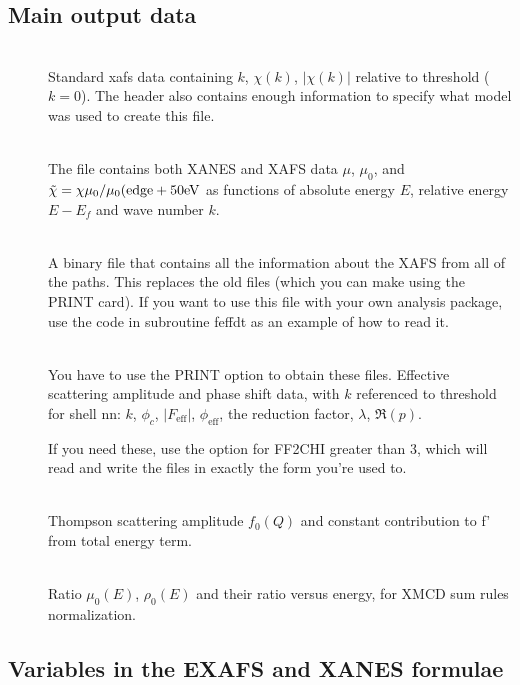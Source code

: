 \documentclass[11pt,oneside]{report} %
\begin{document}
\subsection{Main output data}
\label{sec:Final-Results-Calc}

\begin{description}
\item[]\hfill\\ Standard xafs data containing $k$,
  $\chi(k)$, $|\chi(k)|$ relative to threshold ($k=0$).  The header
  also contains enough information to specify what model was used to
  create this file.
\item[]\hfill\\ The file  contains both XANES and
  XAFS data $\mu$, $\mu_0$, and $\tilde \chi = \chi \mu_0/\mu_0({\rm edge} +
  50 {\rm eV} $ as functions of absolute energy
  $E$, relative energy $E-E_f$ and wave number $k$.
\item[] \hfill\\ A binary file that contains all the
  information about the XAFS from all of the paths.  This replaces the
  old  files (which you can make using the PRINT
  card).  If you want to use this file with your own analysis package,
  use the code in subroutine feffdt as an example of how to read it.
\item[]\hfill\\ You have to use the PRINT option to
  obtain these files.  Effective scattering amplitude and phase shift
  data, with $k$ referenced to threshold for shell nn: $k$, $\phi_c$,
  $|F_{\mathrm{eff}}|$, $\phi_{\mathrm{eff}}$, the reduction factor,
  $\lambda$, $\Re(p)$.

  If you need these, use the  option for FF2CHI
  greater than 3, which will read  and write the
   files in exactly the form you're used to.
\item[] \hfill\\ Thompson scattering amplitude $f_0(Q)$
  and constant contribution to f' from total energy term.
\item[] \hfill\\ Ratio $\mu_0(E)$, $ \rho_0(E)$ and
  their ratio versus energy, for XMCD sum rules normalization.
\end{description}




\subsection{Variables in the EXAFS and XANES formulae}
\label{sec:Vari-EXAFS-form}
\end{document}

